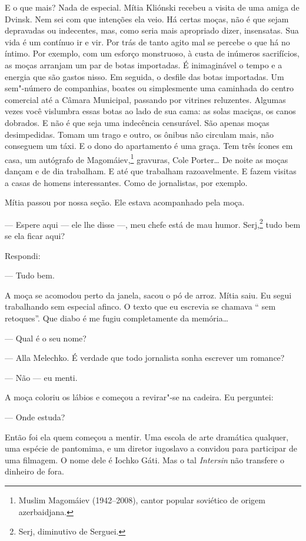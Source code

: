 E o que mais? Nada de especial. Mítia Kliónski recebeu a visita de uma
amiga de Dvinsk. Nem sei com que intenções ela veio. Há certas moças,
não é que sejam depravadas ou indecentes, mas, como seria mais
apropriado dizer, insensatas. Sua vida é um contínuo ir e vir. Por trás
de tanto agito mal se percebe o que há no íntimo. Por exemplo, com um
esforço monstruoso, à custa de inúmeros sacrifícios, as moças arranjam
um par de botas importadas. É inimaginável o tempo e a energia que são
gastos nisso. Em seguida, o desfile das botas importadas. Um sem"-número
de companhias, boates ou simplesmente uma caminhada do centro comercial
até a Câmara Municipal, passando por vitrines reluzentes. Algumas vezes
você vislumbra essas botas ao lado de sua cama: as solas maciças, os
canos dobrados. E não é que seja uma indecência censurável. São apenas
moças desimpedidas. Tomam um trago e outro, os ônibus não circulam mais,
não conseguem um táxi. E o dono do apartamento é uma graça. Tem três
ícones em casa, um autógrafo de Magomáiev,\footnote{Muslim Magomáiev
  (1942--2008), cantor popular soviético de origem azerbaidjana.}
gravuras, Cole Porter\ldots{} De noite as moças dançam e de dia trabalham. E
até que trabalham razoavelmente. E fazem visitas a casas de homens
interessantes. Como de jornalistas, por exemplo.

\bigskip

Mítia passou por nossa seção. Ele estava acompanhado pela moça.

--- Espere aqui --- ele lhe disse ---, meu chefe está de mau humor.
Serj,\footnote{Serj, diminutivo de Serguei.} tudo bem se ela ficar aqui?

Respondi:

--- Tudo bem.

A moça se acomodou perto da janela, sacou o pó de arroz. Mítia saiu. Eu
segui trabalhando sem especial afinco. O texto que eu escrevia se
chamava `` sem retoques''. Que diabo é  me fugiu completamente da
memória\ldots{}

--- Qual é o seu nome?

--- Alla Melechko. É verdade que todo jornalista sonha escrever um
romance?

--- Não --- eu menti.

A moça coloriu os lábios e começou a revirar"-se na cadeira. Eu perguntei:

--- Onde estuda?

Então foi ela quem começou a mentir. Uma escola de arte dramática
qualquer, uma espécie de pantomima, e um diretor iugoslavo a convidou
para participar de uma filmagem. O nome dele é Iochko Gáti. Mas o tal
\emph{Intersin} não transfere o dinheiro de fora.

